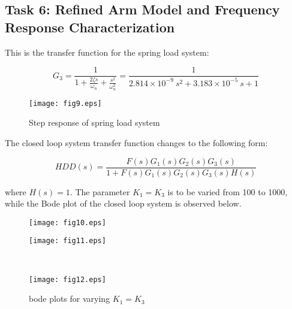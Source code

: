 \documentclass{article}
\newcommand{\matlab}[1]{%
%
}
\begin{document}

\subsection*{Task 6: Refined Arm Model and Frequency Response Characterization}

This is the transfer function for the spring load system:

$$G_3 = \frac{1}{1 + \frac{2\zeta s}{\omega_n} + \frac{s^2}{\omega_n^2}}
      = \frac{1}{2.814\times 10^{-9} ~ s^2 + 3.183\times 10^{-5} ~ s + 1}$$

\matlab{fig9.m}

\begin{figure}[H]
  \caption{Step response of spring load system}
  \centering
  \texttt{[image: fig9.eps]}
\end{figure}

The closed loop system transfer function changes to the following
form:

$$HDD(s) = \frac{F(s)G_1(s)G_2(s)G_3(s)}{1 + F(s)G_1(s)G_2(s)G_3(s)H(s)}$$

\noindent
where $H(s) = 1$.  The parameter $K_1 = K_3$ is to be varied from 100
to 1000, while the Bode plot of the closed loop system is observed
below.

\matlab{fig10.m}

\begin{figure}[H]\centering
  \caption{bode plots for varying $K_1 = K_3$}
  \begin{minipage}{9cm}
    \texttt{[image: fig10.eps]}
  \end{minipage}%
  \begin{minipage}{9cm}
    \texttt{[image: fig11.eps]}
  \end{minipage}\\
  \begin{minipage}{9cm}
    \texttt{[image: fig12.eps]}
  \end{minipage}
\end{figure}
\end{document}
